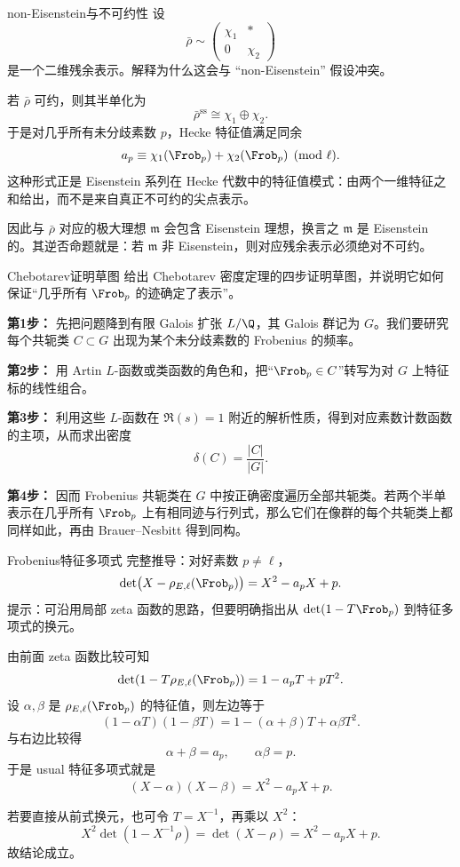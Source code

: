\begin{problem}{non-Eisenstein与不可约性}
设
\[
\bar\rho\sim \begin{pmatrix}\chi_1&*\\0&\chi_2\end{pmatrix}
\]
是一个二维残余表示。解释为什么这会与 ``non-Eisenstein'' 假设冲突。
\end{problem}
\begin{solution}
若 $\bar\rho$ 可约，则其半单化为
\[
\bar\rho^{\mathrm{ss}}\cong \chi_1\oplus\chi_2.
\]
于是对几乎所有未分歧素数 $p$，Hecke 特征值满足同余
\[
a_p\equiv \chi_1(\Frob_p)+\chi_2(\Frob_p)\pmod\ell.
\]
这种形式正是 Eisenstein 系列在 Hecke 代数中的特征值模式：由两个一维特征之和给出，而不是来自真正不可约的尖点表示。

因此与 $\bar\rho$ 对应的极大理想 $\mathfrak m$ 会包含 Eisenstein 理想，换言之 $\mathfrak m$ 是 Eisenstein 的。其逆否命题就是：若 $\mathfrak m$ 非 Eisenstein，则对应残余表示必须绝对不可约。
\end{solution}

\begin{problem}{Chebotarev证明草图}
给出 Chebotarev 密度定理的四步证明草图，并说明它如何保证“几乎所有 $\Frob_p$ 的迹确定了表示”。
\end{problem}
\begin{solution}
\textbf{第1步：} 先把问题降到有限 Galois 扩张 $L/\Q$，其 Galois 群记为 $G$。我们要研究每个共轭类 $C\subset G$ 出现为某个未分歧素数的 Frobenius 的频率。

\textbf{第2步：} 用 Artin $L$-函数或类函数的角色和，把“$\Frob_p\in C$”转写为对 $G$ 上特征标的线性组合。

\textbf{第3步：} 利用这些 $L$-函数在 $\Re(s)=1$ 附近的解析性质，得到对应素数计数函数的主项，从而求出密度
\[
\delta(C)=\frac{|C|}{|G|}.
\]

\textbf{第4步：} 因而 Frobenius 共轭类在 $G$ 中按正确密度遍历全部共轭类。若两个半单表示在几乎所有 $\Frob_p$ 上有相同迹与行列式，那么它们在像群的每个共轭类上都同样如此，再由 Brauer--Nesbitt 得到同构。
\end{solution}

\begin{problem}{Frobenius特征多项式}
完整推导：对好素数 $p\neq \ell$，
\[
\det\bigl(X-\rho_{E,\ell}(\Frob_p)\bigr)=X^2-a_pX+p.
\]
提示：可沿用局部 zeta 函数的思路，但要明确指出从 $\det(1-T\Frob_p)$ 到特征多项式的换元。
\end{problem}
\begin{solution}
由前面 zeta 函数比较可知
\[
\det(1-T\rho_{E,\ell}(\Frob_p))=1-a_pT+pT^2.
\]
设 $\alpha,\beta$ 是 $\rho_{E,\ell}(\Frob_p)$ 的特征值，则左边等于
\[
(1-\alpha T)(1-\beta T)=1-(\alpha+\beta)T+\alpha\beta T^2.
\]
与右边比较得
\[
\alpha+\beta=a_p,
\qquad
\alpha\beta=p.
\]
于是 usual 特征多项式就是
\[
(X-\alpha)(X-\beta)=X^2-a_pX+p.
\]

若要直接从前式换元，也可令 $T=X^{-1}$，再乘以 $X^2$：
\[
X^2\det(1-X^{-1}\rho)=\det(X-\rho)=X^2-a_pX+p.
\]
故结论成立。
\end{solution}

